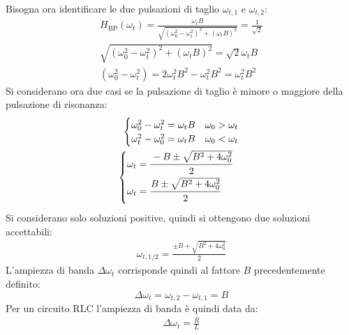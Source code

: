 \documentclass{article}
\numberwithin{equation}{subsection}
\begin{document}
Bisogna ora identificare le due pulsazioni di taglio $\omega_{t,1}$ e $\omega_{t,2}$:
\begin{gather*}
    H_{\mathrm{BP}}(\omega_t)=\displaystyle\frac{\omega_t B}{\sqrt{(\omega_0^2-\omega_t^2)^2+(\omega_t B)^2}}=\frac{1}{\sqrt2}\\
    \sqrt{(\omega_0^2-\omega_t^2)^2+(\omega_t B)^2}=\sqrt2 \omega_tB\\
    (\omega_0^2-\omega_t^2)=2\omega_t^2B^2-\omega_t^2B^2=\omega_t^2B^2
\end{gather*}
Si considerano ora due casi se la pulsazione di taglio è minore o maggiore della pulsazione di risonanza:
\begin{gather*}
    \begin{cases}
        \omega_0^2-\omega_t^2=\omega_tB&\omega_0>\omega_t\\
        \omega_t^2-\omega_0^2=\omega_tB&\omega_0<\omega_t
    \end{cases}\\
    \begin{cases}
        \omega_t=\displaystyle\frac{\strut -B\pm\sqrt{B^2+4\omega_0^2}}{\strut2}\\
        \omega_t=\displaystyle\frac{\strut B\pm\sqrt{B^2+4\omega_0^2}}{\strut2}
    \end{cases}
\end{gather*}
Si considerano solo soluzioni positive, quindi si ottengono due soluzioni accettabili:
\begin{gather}
    \omega_{t,1/2}=\displaystyle\frac{\pm B+\sqrt{B^2+4\omega_0^2}}{2}
\end{gather}
L'ampiezza di banda $\Delta\omega_t$ corrisponde quindi al fattore $B$ precedentemente definito:
\begin{equation}
    \Delta\omega_t=\omega_{t,2}-\omega_{t,1}=B
\end{equation}
Per un circuito RLC l'ampiezza di banda è quindi data da:
\begin{gather*}
    \Delta\omega_t=\displaystyle\frac{R}{L}
\end{gather*}
\end{document}
